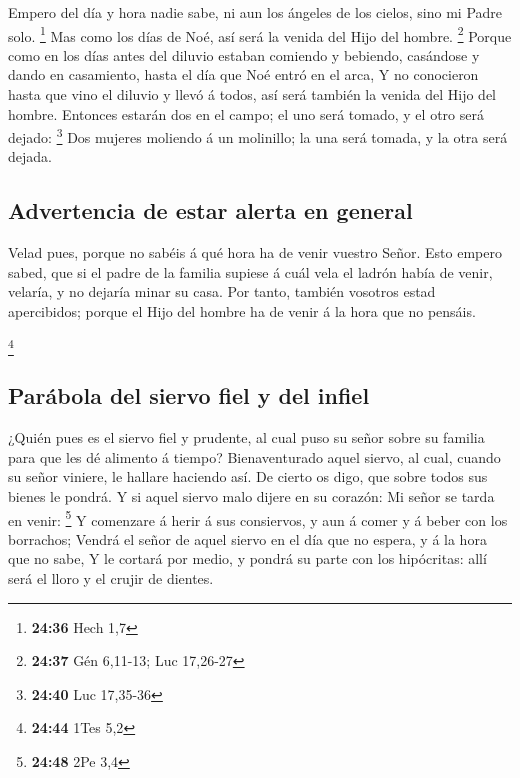  Empero del día y hora nadie sabe, ni aun los ángeles de
los cielos, sino mi Padre solo. \footnote{\textbf{24:36} Hech 1,7}
 Mas como los días de Noé, así será la venida del Hijo
del hombre. \footnote{\textbf{24:37} Gén 6,11-13; Luc 17,26-27}
 Porque como en los días antes del diluvio estaban
comiendo y bebiendo, casándose y dando en casamiento, hasta el día que
Noé entró en el arca,  Y no conocieron hasta que vino el
diluvio y llevó á todos, así será también la venida del Hijo del hombre.
 Entonces estarán dos en el campo; el uno será tomado, y
el otro será dejado: \footnote{\textbf{24:40} Luc 17,35-36}
 Dos mujeres moliendo á un molinillo; la una será tomada,
y la otra será dejada.

\hypertarget{advertencia-de-estar-alerta-en-general}{%
\subsection{Advertencia de estar alerta en
general}\label{advertencia-de-estar-alerta-en-general}}

 Velad pues, porque no sabéis á qué hora ha de venir
vuestro Señor.  Esto empero sabed, que si el padre de la
familia supiese á cuál vela el ladrón había de venir, velaría, y no
dejaría minar su casa.  Por tanto, también vosotros estad
apercibidos; porque el Hijo del hombre ha de venir á la hora que no
pensáis.

\footnote{\textbf{24:44} 1Tes 5,2}

\hypertarget{paruxe1bola-del-siervo-fiel-y-del-infiel}{%
\subsection{Parábola del siervo fiel y del
infiel}\label{paruxe1bola-del-siervo-fiel-y-del-infiel}}

 ¿Quién pues es el siervo fiel y prudente, al cual puso
su señor sobre su familia para que les dé alimento á tiempo?
 Bienaventurado aquel siervo, al cual, cuando su señor
viniere, le hallare haciendo así.  De cierto os digo, que
sobre todos sus bienes le pondrá.  Y si aquel siervo malo
dijere en su corazón: Mi señor se tarda en venir: \footnote{\textbf{24:48}
  2Pe 3,4}  Y comenzare á herir á sus consiervos, y aun á
comer y á beber con los borrachos;  Vendrá el señor de
aquel siervo en el día que no espera, y á la hora que no sabe,
 Y le cortará por medio, y pondrá su parte con los
hipócritas: allí será el lloro y el crujir de dientes.

